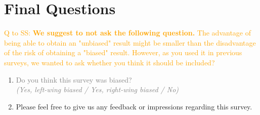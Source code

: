 \documentclass[11pt]{article}
\newcommand{\tk}[1]{\textcolor{orange}{#1}}
\begin{document}
\section*{Final Questions}
\tk{Q to SS: \textbf{We suggest to not ask the following question.} The advantage of being able to obtain an "unbiased" result might be smaller than the disadvantage of the risk of obtaining a "biased" result. However, as you used it in previous surveys, we wanted to ask whether you think it should be included?}
\begin{enumerate}[resume]
    \item[\sout{\theenumi.}] \textcolor{gray}{Do you think this survey was biased?\\ \textit{(Yes, left-wing biased / Yes, right-wing biased / No)}}
    \item Please feel free to give us any feedback or impressions regarding this survey.
\end{enumerate}    
\end{document}
